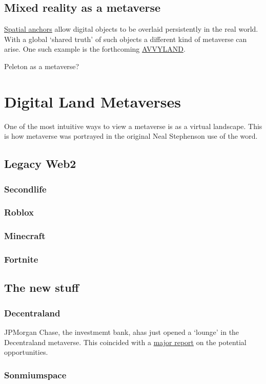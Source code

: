 \subsection{Mixed reality as a metaverse}
\href{https://docs.microsoft.com/en-us/windows/mixed-reality/design/spatial-anchors}{Spatial anchors} allow digital objects to be overlaid persistently in the real world. With a global `shared truth' of such objects a different kind of metaverse can arise.
One such example is the forthcoming \href{https://avvyland.com/}{AVVYLAND}.

Peleton as a metaverse?

\section{Digital Land Metaverses}
One of the most intuitive ways to view a metaverse is as a virtual landscape. This is how metaverse was portrayed in the original Neal Stephenson use of the word. 
\subsection{Legacy Web2}
\subsubsection{Secondlife}
\subsubsection{Roblox}
\subsubsection{Minecraft}
\subsubsection{Fortnite}
\subsection{The new stuff}
\subsubsection{Decentraland}
JPMorgan Chase, the investmemt bank, ahas just opened a `lounge' in the Decentraland metaverse. This coincided with a \href{https://www.jpmorgan.com/content/dam/jpm/treasury-services/documents/opportunities-in-the-metaverse.pdf}{major report} on the potential opportunities.
\subsubsection{Sonmiumspace}

